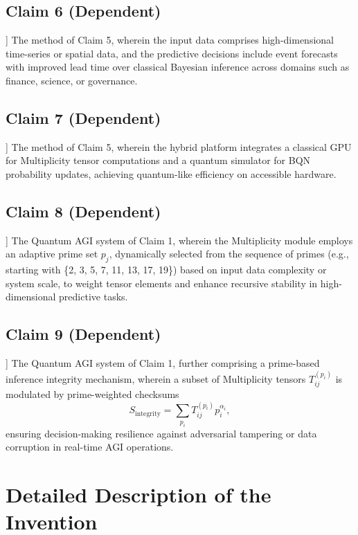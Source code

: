 \documentclass[12pt]{article}
\begin{document}
\begin{enumerate}
    \subsection{Claim 6 (Dependent)}] The method of Claim 5, wherein the input data comprises high-dimensional time-series or spatial data, and the predictive decisions include event forecasts with improved lead time over classical Bayesian inference across domains such as finance, science, or governance.

    \subsection{Claim 7 (Dependent)}] The method of Claim 5, wherein the hybrid platform integrates a classical GPU for Multiplicity tensor computations and a quantum simulator for BQN probability updates, achieving quantum-like efficiency on accessible hardware.

    \subsection{Claim 8 (Dependent)}] The Quantum AGI system of Claim 1, wherein the Multiplicity module employs an adaptive prime set \( p_j \), dynamically selected from the sequence of primes (e.g., starting with \{2, 3, 5, 7, 11, 13, 17, 19\}) based on input data complexity or system scale, to weight tensor elements and enhance recursive stability in high-dimensional predictive tasks.

    \subsection{Claim 9 (Dependent)}] The Quantum AGI system of Claim 1, further comprising a prime-based inference integrity mechanism, wherein a subset of Multiplicity tensors \( T_{ij}^{(p_i)} \) is modulated by prime-weighted checksums
    \begin{equation}
    S_{\text{integrity}} = \sum_{p_i} T_{ij}^{(p_i)} p_i^{\alpha_i},
    \end{equation}
    ensuring decision-making resilience against adversarial tampering or data corruption in real-time AGI operations.
\end{enumerate}

\section{Detailed Description of the Invention}
\end{document}
